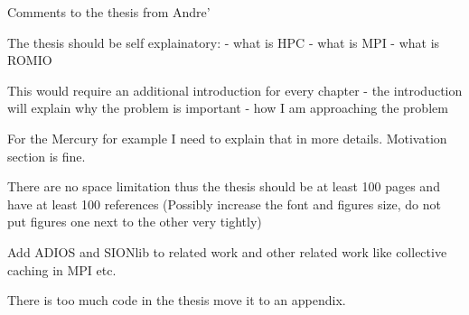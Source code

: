 Comments to the thesis from Andre'

The thesis should be self explainatory:
 - what is HPC 
 - what is MPI
 - what is ROMIO

 This would require an additional introduction for every chapter
 - the introduction will explain why the problem is important 
 - how I am approaching the problem 

For the Mercury for example I need to explain that in more details. Motivation section is fine.

There are no space limitation thus the thesis should be at least 100 pages and have at least 100 references
(Possibly increase the font and figures size, do not put figures one next to the other very tightly)

Add ADIOS and SIONlib to related work and other related work like collective caching in MPI etc.

There is too much code in the thesis move it to an appendix.

